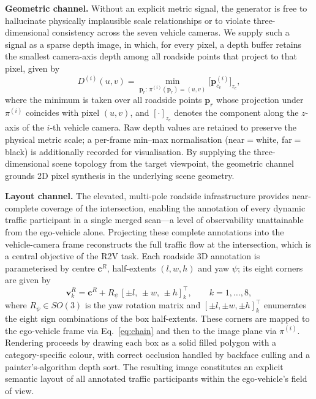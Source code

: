 \textbf{Geometric channel.}
Without an explicit metric signal, the generator is free to
hallucinate physically implausible scale relationships or to
violate three-dimensional consistency across the seven
vehicle cameras. We supply such a signal as a sparse depth
image, in which, for every pixel, a depth buffer retains the
smallest camera-axis depth among all roadside points that
project to that pixel, given by
%
\begin{equation}
  \label{eq:depth}
  D^{(i)}(u,v) =
  \min_{\mathbf{p}_r:\,\pi^{(i)}(\mathbf{p}_r)=(u,v)}
  \bigl[\mathbf{p}_{c_v}^{(i)}\bigr]_{z_c},
\end{equation}
%
where the minimum is taken over all roadside points
$\mathbf{p}_r$ whose projection under $\pi^{(i)}$ coincides
with pixel $(u,v)$, and $[\cdot]_{z_c}$ denotes the
component along the $z$-axis of the $i$-th vehicle camera.
Raw depth values are retained to preserve the physical
metric scale; a per-frame min--max normalisation
(near$=$white, far$=$black) is additionally recorded for
visualisation. By supplying the three-dimensional scene
topology from the target viewpoint, the geometric channel
grounds 2D pixel synthesis in the underlying scene geometry.

\textbf{Layout channel.}
The elevated, multi-pole roadside infrastructure provides
near-complete coverage of the intersection, enabling the
annotation of every dynamic traffic participant in a single
merged scan---a level of observability unattainable from the
ego-vehicle alone. Projecting these complete annotations into
the vehicle-camera frame reconstructs the full traffic flow
at the intersection, which is a central objective of the R2V
task. Each roadside 3D annotation is parameterised by centre
$\mathbf{c}^R$, half-extents $(l,w,h)$ and yaw $\psi$; its
eight corners are given by
%
\begin{equation}
  \label{eq:corners}
  \mathbf{v}_k^R = \mathbf{c}^R
  + R_\psi\,[\pm l,\,\pm w,\,\pm h]^\top_k,
  \qquad k=1,\ldots,8,
\end{equation}
%
where $R_\psi\!\in\!SO(3)$ is the yaw rotation matrix and
$[\pm l,\pm w,\pm h]^\top_k$ enumerates the eight sign
combinations of the box half-extents. These corners are
mapped to the ego-vehicle frame via Eq.~\eqref{eq:chain} and
then to the image plane via $\pi^{(i)}$. Rendering proceeds
by drawing each box as a solid filled polygon with a
category-specific colour, with correct occlusion handled by
backface culling and a painter's-algorithm depth sort. The
resulting image constitutes an explicit semantic layout of
all annotated traffic participants within the ego-vehicle's
field of view.

